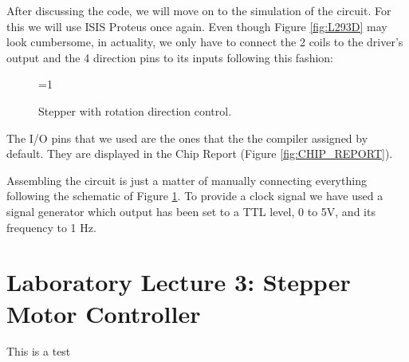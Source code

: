 \documentclass[a4paper, 11pt, oneside]{article}
\begin{document}
After discussing the code, we will move on to the simulation of the circuit. For this we will use ISIS Proteus once again. Even though Figure \ref{fig:L293D} may look cumbersome, in actuality, we only have to connect the 2 coils to the driver's output and the 4 direction pins to its inputs following this fashion:\medskip

\begin{figure}[H]
    \centering
    
    \ifnum\value{ANIMATION}=1 {
    } 
    \fi
    
    \caption{Stepper with rotation direction control.}
    \label{fig:STEPPER_ROTATION}
\end{figure}

The I/O pins that we used are the ones that the the compiler assigned by default. They are displayed in the Chip Report (Figure \ref{fig:CHIP_REPORT}).\medskip

Assembling the circuit is just a matter of manually connecting everything following the schematic of Figure \ref{fig:STEPPER_ROTATION}. To provide a clock signal we have used a signal generator which output has been set to a TTL level, 0 to 5V, and its frequency to 1 Hz.  

\clearpage

\section{Laboratory Lecture 3: Stepper Motor Controller}

This is a test


\clearpage
\printbibliography
\end{document}
